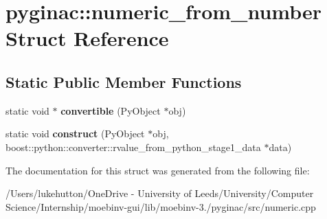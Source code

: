 \hypertarget{structpyginac_1_1numeric__from__number}{}\section{pyginac\+:\+:numeric\+\_\+from\+\_\+number Struct Reference}
\label{structpyginac_1_1numeric__from__number}
\subsection*{Static Public Member Functions}
\begin{DoxyCompactItemize}
\item 
\mbox{\label{structpyginac_1_1numeric__from__number_aa13765d6a3a07e59242b8389fc7dbcab}} 
static void $\ast$ {\bfseries convertible} (Py\+Object $\ast$obj)
\item 
\mbox{\label{structpyginac_1_1numeric__from__number_a64dbc1aa68695a8d660b02a554d626bd}} 
static void {\bfseries construct} (Py\+Object $\ast$obj, boost\+::python\+::converter\+::rvalue\+\_\+from\+\_\+python\+\_\+stage1\+\_\+data $\ast$data)
\end{DoxyCompactItemize}


The documentation for this struct was generated from the following file\+:\begin{DoxyCompactItemize}
\item 
/\+Users/lukehutton/\+One\+Drive -\/ University of Leeds/\+University/\+Computer Science/\+Internship/moebinv-\/gui/lib/moebinv-\/3./pyginac/src/numeric.\+cpp\end{DoxyCompactItemize}
